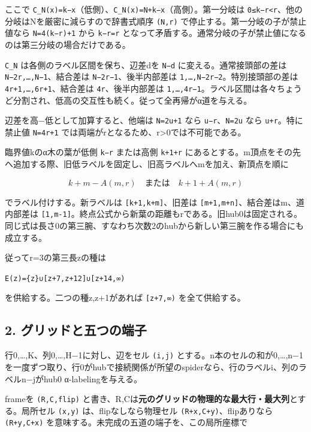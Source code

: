 \documentclass[
  10pt,
  a4paper,
]{article}
\let\originaltexttt\texttt
\renewcommand{\texttt}[1]{\leavevmode\allowbreak\mbox{\originaltexttt{#1}}}
\begin{document}
ここで
\texttt{C\_N(x)=k−x}（低側）、\texttt{C\_N(x)=N+k−x}（高側）。第一分岐は
\texttt{0≤k−r\textless{}r}、他の分岐はNを厳密に減らすので辞書式順序
\texttt{(N,r)} で停止する。第一分岐の子が禁止値なら \texttt{N=4(k−r)+1}
から \texttt{k−r=r}
となって矛盾する。通常分岐の子が禁止値になるのは第三分岐の場合だけである。

\texttt{C\_N} は各側のラベル区間を保ち、辺差dを \texttt{N−d}
に変える。通常接頭部の差は \texttt{N−2r,…,N−1}、結合差は
\texttt{N−2r−1}、後半内部差は \texttt{1,…,N−2r−2}。特別接頭部の差は
\texttt{4r+1,…,6r+1}、結合差は \texttt{4r}、後半内部差は
\texttt{1,…,4r−1}。ラベル区間は各々ちょうど分割され、低高の交互性も続く。従って全再帰がα道を与える。

辺差を高−低として加算すると、他端は \texttt{N=2u+1} なら
\texttt{u−r}、\texttt{N=2u} なら \texttt{u+r}。特に禁止値
\texttt{N=4r+1} では両端がrとなるため、r\textgreater0では不可能である。

臨界値kのα木の葉が低側 \texttt{k−r} または高側 \texttt{k+1+r}
にあるとする。m頂点をその先へ追加する際、旧低ラベルを固定し、旧高ラベルへmを加え、新頂点を順に

\[
k+m-A(m,r)\quad\text{または}\quad k+1+A(m,r)
\]

でラベル付けする。新ラベルは \texttt{{[}k+1,k+m{]}}、旧差は
\texttt{{[}m+1,m+n{]}}、結合差はm、道内部差は
\texttt{{[}1,m-1{]}}。終点公式から新葉の距離もrである。旧hub0は固定される。同じ式は長さ0の第三腕、すなわち次数2のhubから新しい第三腕を作る場合にも成立する。

従ってr=3の第三長zの種は

\texttt{E(z)=\{z\}∪{[}z+7,z+12{]}∪{[}z+14,∞)}

を供給する。二つの種z,z+1があれば \texttt{{[}z+7,∞)} を全て供給する。

\subsection{2.
グリッドと五つの端子}\label{ux30b0ux30eaux30c3ux30c9ux3068ux4e94ux3064ux306eux7aefux5b50}

行0,\ldots,K、列0,\ldots,H−1に対し、辺をセル \texttt{(i,j)}
とする。n本のセルの和が0,\ldots,n−1を一度ずつ取り、行0がhubで接続関係が所望のspiderなら、行のラベルi、列のラベルn−jがhub0
α-labelingを与える。

frameを \texttt{(R,C,flip)}
と書き、R,Cは\textbf{元のグリッドの物理的な最大行・最大列}とする。局所セル
\texttt{(x,y)} は、flipなしなら物理セル \texttt{(R+x,C+y)}、flipありなら
\texttt{(R+y,C+x)} を意味する。未完成の五道の端子を、この局所座標で
\end{document}

